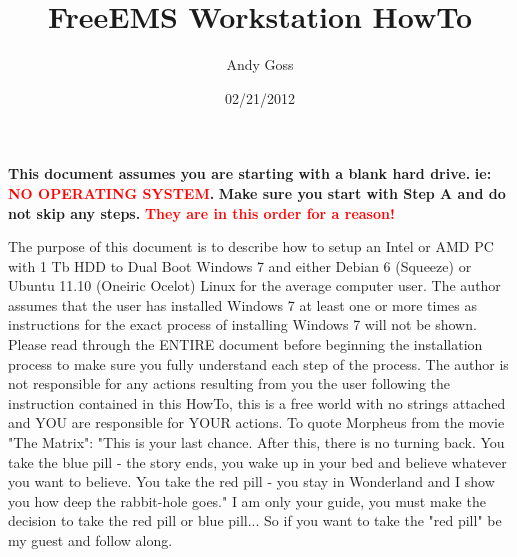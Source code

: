 \documentclass[12pt,notitlepage,onecolumn,oneside,openany,draft]{memoir}
\title{\textsf{FreeEMS Workstation HowTo}}
\author{\textsf{Andy Goss}}
\date{\textsf{02/21/2012}}
\begin{document}
\maketitle

\begin{center}
\textbf{\textsf{This document assumes you are starting with a blank hard drive.}} \newline
\textbf{\textsf{ie: \textcolor{red}{NO OPERATING SYSTEM}.}} \newline
\newline
\textbf{\textsf{Make sure you start with Step A and do not skip any steps.}} \newline
\textbf{\textsf{\textcolor{red}{They are in this order for a reason!}}} \newline
\end{center}
\newline
\textsf{The purpose of this document is to describe how to setup an Intel or AMD PC with 1 Tb HDD to Dual Boot Windows 7 and either Debian 6 (Squeeze) or Ubuntu 11.10 (Oneiric Ocelot) Linux for the average computer user.  The author assumes that the user has installed Windows 7 at least one or more times as instructions for the exact process of installing Windows 7 will not be shown.} \newline
\newline
\textsf{Please read through the ENTIRE document before beginning the installation process to make sure you fully understand each step of the process.  The author is not responsible for any actions resulting from you the user following the instruction contained in this HowTo, this is a free world with no strings attached and YOU are responsible for YOUR actions.} \newline
\newline
\textsf{To quote Morpheus from the movie "The Matrix": "This is your last chance. After this, there is no turning back. You take the blue pill - the story ends, you wake up in your bed and believe whatever you want to believe. You take the red pill - you stay in Wonderland and I show you how deep the rabbit-hole goes." \newline
\newline
I am only your guide, you must make the decision to take the red pill or blue pill...  So if you want to take the "red pill" be my guest and follow along.} \newline
\newline
\end{document}
